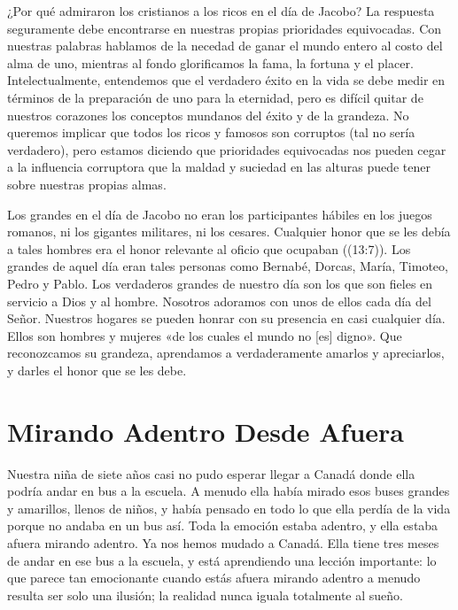 \documentclass[12pt, twoside, openright]{book}
\begin{document}
¿Por qué admiraron los cristianos a los ricos en el día de Jacobo? La respuesta seguramente debe encontrarse en nuestras propias prioridades equivocadas. Con nuestras palabras hablamos de la necedad de ganar el mundo entero al costo del alma de uno, mientras al fondo glorificamos la fama, la fortuna y el placer. Intelectualmente, entendemos que el verdadero éxito en la vida se debe medir en términos de la preparación de uno para la eternidad, pero es difícil quitar de nuestros corazones los conceptos mundanos del éxito y de la grandeza. No queremos implicar que todos los ricos y famosos son corruptos (tal no sería verdadero), pero estamos diciendo que prioridades equivocadas nos pueden cegar a la influencia corruptora que la maldad y suciedad en las alturas puede tener sobre nuestras propias almas.

Los grandes en el día de Jacobo no eran los participantes hábiles en los juegos romanos, ni los gigantes militares, ni los cesares. Cualquier honor que se les debía a tales hombres era el honor relevante al oficio que ocupaban ((13:7)). Los grandes de aquel día eran tales personas como Bernabé, Dorcas, María, Timoteo, Pedro y Pablo. Los verdaderos grandes de nuestro día son los que son fieles en servicio a Dios y al hombre. Nosotros adoramos con unos de ellos cada día del Señor. Nuestros hogares se pueden honrar con su presencia en casi cualquier día. Ellos son hombres y mujeres «de los cuales el mundo no [es] digno». Que reconozcamos su grandeza, aprendamos a verdaderamente amarlos y apreciarlos, y darles el honor que se les debe.

\section{Mirando Adentro Desde Afuera}
Nuestra niña de siete años casi no pudo esperar llegar a Canadá donde ella podría andar en bus a la escuela. A menudo ella había mirado esos buses grandes y amarillos, llenos de niños, y había pensado en todo lo que ella perdía de la vida porque no andaba en un bus así. Toda la emoción estaba adentro, y ella estaba afuera mirando adentro. Ya nos hemos mudado a Canadá. Ella tiene tres meses de andar en ese bus a la escuela, y está aprendiendo una lección importante: lo que parece tan emocionante cuando estás afuera mirando adentro a menudo resulta ser solo una ilusión; la realidad nunca iguala totalmente al sueño. 
\end{document}
